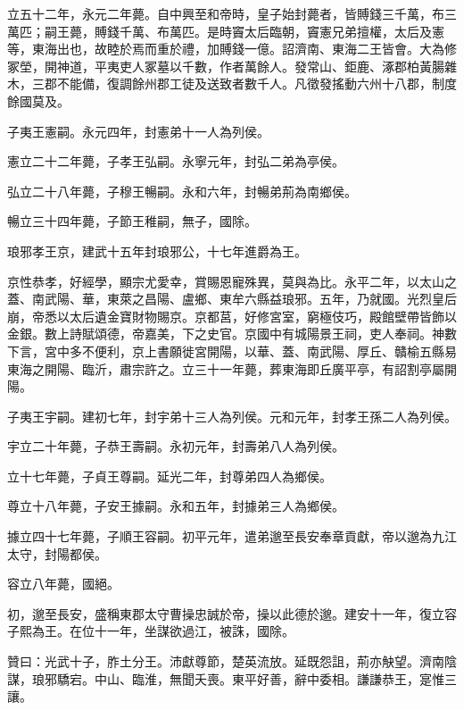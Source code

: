 \begin{pinyinscope}
立五十二年，永元二年薨。自中興至和帝時，皇子始封薨者，皆賻錢三千萬，布三萬匹；嗣王薨，賻錢千萬、布萬匹。是時竇太后臨朝，竇憲兄弟擅權，太后及憲等，東海出也，故睦於焉而重於禮，加賻錢一億。詔濟南、東海二王皆會。大為修冢塋，開神道，平夷吏人冢墓以千數，作者萬餘人。發常山、鉅鹿、涿郡柏黃腸雜木，三郡不能備，復調餘州郡工徒及送致者數千人。凡徵發搖動六州十八郡，制度餘國莫及。

子夷王憲嗣。永元四年，封憲弟十一人為列侯。

憲立二十二年薨，子孝王弘嗣。永寧元年，封弘二弟為亭侯。

弘立二十八年薨，子穆王暢嗣。永和六年，封暢弟荊為南鄉侯。

暢立三十四年薨，子節王稚嗣，無子，國除。

琅邪孝王京，建武十五年封琅邪公，十七年進爵為王。

京性恭孝，好經學，顯宗尤愛幸，賞賜恩寵殊異，莫與為比。永平二年，以太山之蓋、南武陽、華，東萊之昌陽、盧鄉、東牟六縣益琅邪。五年，乃就國。光烈皇后崩，帝悉以太后遺金寶財物賜京。京都莒，好修宮室，窮極伎巧，殿館壁帶皆飾以金銀。數上詩賦頌德，帝嘉美，下之史官。京國中有城陽景王祠，吏人奉祠。神數下言，宮中多不便利，京上書願徙宮開陽，以華、蓋、南武陽、厚丘、贛榆五縣易東海之開陽、臨沂，肅宗許之。立三十一年薨，葬東海即丘廣平亭，有詔割亭屬開陽。

子夷王宇嗣。建初七年，封宇弟十三人為列侯。元和元年，封孝王孫二人為列侯。

宇立二十年薨，子恭王壽嗣。永初元年，封壽弟八人為列侯。

立十七年薨，子貞王尊嗣。延光二年，封尊弟四人為鄉侯。

尊立十八年薨，子安王據嗣。永和五年，封據弟三人為鄉侯。

據立四十七年薨，子順王容嗣。初平元年，遣弟邈至長安奉章貢獻，帝以邈為九江太守，封陽都侯。

容立八年薨，國絕。

初，邈至長安，盛稱東郡太守曹操忠誠於帝，操以此德於邈。建安十一年，復立容子熙為王。在位十一年，坐謀欲過江，被誅，國除。

贊曰：光武十子，胙土分王。沛獻尊節，楚英流放。延既怨詛，荊亦觖望。濟南陰謀，琅邪驕宕。中山、臨淮，無聞夭喪。東平好善，辭中委相。謙謙恭王，寔惟三讓。


\end{pinyinscope}
